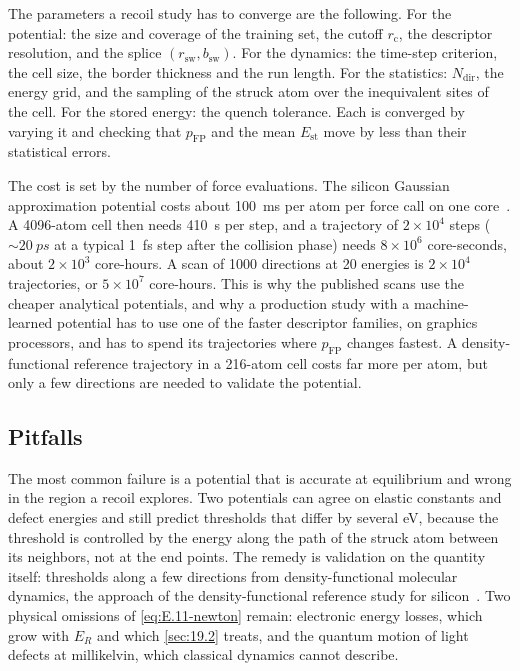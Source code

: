 The parameters a recoil study has to converge are the following. For the potential: the size and coverage of the training set, the cutoff $r_{\mathrm{c}}$, the descriptor resolution, and the splice $(r_{\mathrm{sw}}, b_{\mathrm{sw}})$. For the dynamics: the time-step criterion, the cell size, the border thickness and the run length. For the statistics: $N_{\mathrm{dir}}$, the energy grid, and the sampling of the struck atom over the inequivalent sites of the cell. For the stored energy: the quench tolerance. Each is converged by varying it and checking that $p_{\mathrm{FP}}$ and the mean $E_{\mathrm{st}}$ move by less than their statistical errors.

The cost is set by the number of force evaluations. The silicon Gaussian approximation potential costs about \SI{100}{ms} per atom per force call on one core~\cite[Sect.~V]{bartok2018machine}. A 4096-atom cell then needs \SI{410}{s} per step, and a trajectory of $2\times10^4$ steps ($\sim\SI{20}{ps}$ at a typical \SI{1}{fs} step after the collision phase) needs $8\times10^6$ core-seconds, about $2\times10^3$ core-hours. A scan of 1000 directions at 20 energies is $2\times10^4$ trajectories, or $5\times10^7$ core-hours. This is why the published scans use the cheaper analytical potentials, and why a production study with a machine-learned potential has to use one of the faster descriptor families, on graphics processors, and has to spend its trajectories where $p_{\mathrm{FP}}$ changes fastest. A density-functional reference trajectory in a 216-atom cell costs far more per atom, but only a few directions are needed to validate the potential.

\subsection{Pitfalls}

The most common failure is a potential that is accurate at equilibrium and wrong in the region a recoil explores. Two potentials can agree on elastic constants and defect energies and still predict thresholds that differ by several eV, because the threshold is controlled by the energy along the path of the struck atom between its neighbors, not at the end points. The remedy is validation on the quantity itself: thresholds along a few directions from density-functional molecular dynamics, the approach of the density-functional reference study for silicon~\cite{holmstrom2008threshold}. Two physical omissions of \cref{eq:E.11-newton} remain: electronic energy losses, which grow with $E_R$ and which \cref{sec:19.2} treats, and the quantum motion of light defects at millikelvin, which classical dynamics cannot describe.

